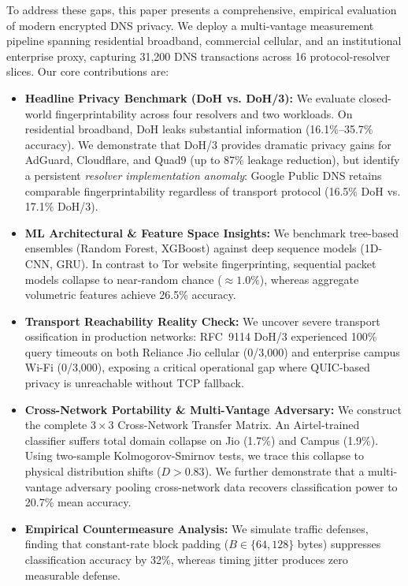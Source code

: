 \documentclass[conference,10pt]{IEEEtran}
\begin{document}
To address these gaps, this paper presents a comprehensive, empirical evaluation of modern encrypted DNS privacy. We deploy a multi-vantage measurement pipeline spanning residential broadband, commercial cellular, and an institutional enterprise proxy, capturing 31,200 DNS transactions across 16 protocol-resolver slices. Our core contributions are:

\begin{itemize}
    \item \textbf{Headline Privacy Benchmark (DoH vs. DoH/3):} We evaluate closed-world fingerprintability across four resolvers and two workloads. On residential broadband, DoH leaks substantial information (16.1\%--35.7\% accuracy). We demonstrate that DoH/3 provides dramatic privacy gains for AdGuard, Cloudflare, and Quad9 (up to 87\% leakage reduction), but identify a persistent \emph{resolver implementation anomaly}: Google Public DNS retains comparable fingerprintability regardless of transport protocol (16.5\% DoH vs. 17.1\% DoH/3).
    \item \textbf{ML Architectural \& Feature Space Insights:} We benchmark tree-based ensembles (Random Forest, XGBoost) against deep sequence models (1D-CNN, GRU). In contrast to Tor website fingerprinting, sequential packet models collapse to near-random chance ($\approx 1.0\%$), whereas aggregate volumetric features achieve 26.5\% accuracy.
    \item \textbf{Transport Reachability Reality Check:} We uncover severe transport ossification in production networks: RFC~9114 DoH/3 experienced 100\% query timeouts on both Reliance Jio cellular (0/3,000) and enterprise campus Wi-Fi (0/3,000), exposing a critical operational gap where QUIC-based privacy is unreachable without TCP fallback.
    \item \textbf{Cross-Network Portability \& Multi-Vantage Adversary:} We construct the complete $3 \times 3$ Cross-Network Transfer Matrix. An Airtel-trained classifier suffers total domain collapse on Jio (1.7\%) and Campus (1.9\%). Using two-sample Kolmogorov-Smirnov tests, we trace this collapse to physical distribution shifts ($D > 0.83$). We further demonstrate that a multi-vantage adversary pooling cross-network data recovers classification power to 20.7\% mean accuracy.
    \item \textbf{Empirical Countermeasure Analysis:} We simulate traffic defenses, finding that constant-rate block padding ($B \in \{64, 128\}$ bytes) suppresses classification accuracy by 32\%, whereas timing jitter produces zero measurable defense.
\end{itemize}
\end{document}
